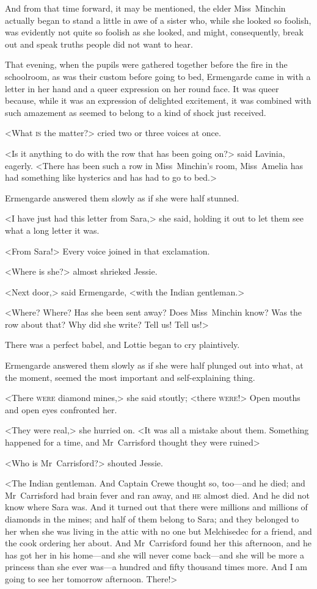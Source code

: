 And from that time forward, it may be mentioned, the elder Miss~Minchin actually began to stand a little in awe of a sister who, while she looked so foolish, was evidently not quite so foolish as she looked, and might, consequently, break out and speak truths people did not want to hear.

That evening, when the pupils were gathered together before the fire in the schoolroom, as was their custom before going to bed, Ermengarde came in with a letter in her hand and a queer expression on her round face. It was queer because, while it was an expression of delighted excitement, it was combined with such amazement as seemed to belong to a kind of shock just received.

<What \textsc{is} the matter?> cried two or three voices at once.

<Is it anything to do with the row that has been going on?> said Lavinia, eagerly. <There has been such a row in Miss~Minchin's room, Miss~Amelia has had something like hysterics and has had to go to bed.>

Ermengarde answered them slowly as if she were half stunned.

<I have just had this letter from Sara,> she said, holding it out to let them see what a long letter it was.

<From Sara!> Every voice joined in that exclamation.

<Where is she?> almost shrieked Jessie.

<Next door,> said Ermengarde, <with the Indian gentleman.>

<Where? Where? Has she been sent away? Does Miss~Minchin know? Was the row about that? Why did she write? Tell us! Tell us!>

There was a perfect babel, and Lottie began to cry plaintively.

Ermengarde answered them slowly as if she were half plunged out into what, at the moment, seemed the most important and self-explaining thing.

<There \textsc{were} diamond mines,> she said stoutly; <there \textsc{were}!> Open mouths and open eyes confronted her.

<They were real,> she hurried on. <It was all a mistake about them. Something happened for a time, and Mr~Carrisford thought they were ruined\longdash>

<Who is Mr~Carrisford?> shouted Jessie.

<The Indian gentleman. And Captain Crewe thought so, too—and he died; and Mr~Carrisford had brain fever and ran away, and \textsc{he} almost died. And he did not know where Sara was. And it turned out that there were millions and millions of diamonds in the mines; and half of them belong to Sara; and they belonged to her when she was living in the attic with no one but Melchisedec for a friend, and the cook ordering her about. And Mr~Carrisford found her this afternoon, and he has got her in his home—and she will never come back—and she will be more a princess than she ever was—a hundred and fifty thousand times more. And I am going to see her tomorrow afternoon. There!>

